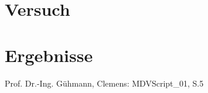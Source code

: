 
\section{Versuch}
\begin{quote}
	
\end{quote}


\section{Ergebnisse}
\begin{quote}
	
\end{quote}


\begin{thebibliography}{999}
 Prof. Dr.-Ing. Gühmann, Clemens: MDVScript\_01, S.5

\end{thebibliography}





